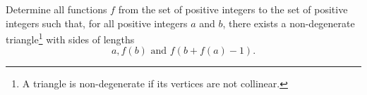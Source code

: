 Determine all functions $ f$ from the set of positive integers to the set of positive integers such that, for all positive integers $ a$ and $ b$,  there exists a non-degenerate triangle\footnote{A triangle is non-degenerate if its vertices are not collinear.} with sides of lengths\[ a, f(b) \text{ and } f(b + f(a) - 1).\]

